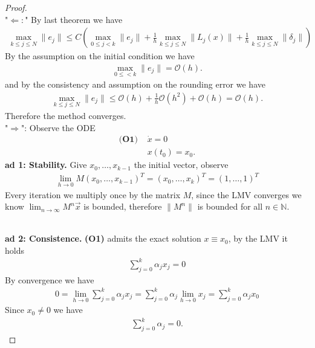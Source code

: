 \documentclass[a4paper,12pt,oneside,fleqn]{book}
\theoremstyle{definition}
\theoremstyle{remark}
\begin{document}
\begin{proof}
\quad\\
"$\Leftarrow:$" By last theorem we have
\begin{align*}
	\max_{k \le j \le N} \|e_j\| \le C( \max_{0 \le j < k} \|e_j\| + \frac{1}{h} \max_{k \le j \le N}\|L_j(x)\| + \frac{1}{h}\max_{k \le j \le N} \|\delta_j\|)
\end{align*}
By the assumption on the initial condition we have
\begin{align*}
	\max_{0 \le < k} \|e_j\|  = \mathcal{O}(h). 
\end{align*}
and by the consistency and assumption on the rounding error we have
\begin{align*}
	\max_{k \le j \le N} \|e_j\| \le \mathcal{O}(h) + \frac{1}{h} \mathcal{O}(h^2) + \mathcal{O}(h) = \mathcal{O}(h). 
\end{align*}
Therefore the method converges.\\
"$\Rightarrow$": Observe the ODE
\begin{align*}
\textbf{(O1) }
	& \dot{x} = 0\\
	& x(t_0) = x_0.
\end{align*}
\textbf{ad 1: Stability.} Give $x_0, \dots, x_{k -1}$ the initial vector, observe
\begin{align*}
\lim_{h \rightarrow 0} M (x_0, \dots, x_{k -1})^T = (x_0, \dots, x_k)^T = (1, \dots, 1)^T
\end{align*}
Every iteration we multiply once by the matrix $M$, since the LMV converges we know $\lim_{n \rightarrow \infty} M^n \vec{x}$ is bounded, therefore $\|M^n\|$ is bounded for all $n \in \mathbb{N}$. 

\quad\\
\textbf{ad 2: Consistence.}
\textbf{(O1)} admits the exact solution $x \equiv x_0$, by the LMV it holds
\begin{align*}
	\sum_{j = 0}^k \alpha_j x_j = 0
\end{align*}
By convergence we have
\begin{align*}
	0 = \lim_{h \rightarrow 0}\sum_{j = 0}^k \alpha_j x_j  = \sum_{j = 0}^k \alpha_j \lim_{h \rightarrow 0}x_j = \sum_{j = 0}^k \alpha_j x _0
\end{align*}
Since $x_0 \neq 0$ we have
\begin{align*}
	\sum_{j = 0}^k \alpha_j = 0. 
\end{align*}
\end{proof}
\end{document}
